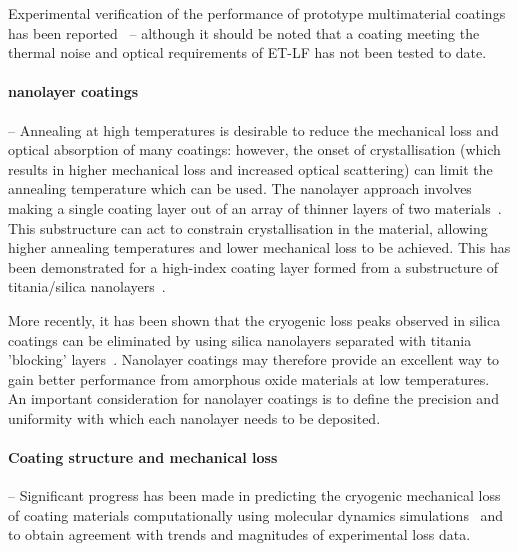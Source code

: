Experimental verification of the performance of prototype multimaterial coatings has been reported~\cite{Gras_GWADW,Kinley_Hanlon_Warsaw} -- although it should be noted that a coating meeting the thermal noise and optical requirements of ET-LF has not been tested to date.

\paragraph{nanolayer coatings} -- Annealing at high temperatures is desirable to reduce the mechanical loss and optical absorption of many coatings: however, the onset of crystallisation (which results in higher mechanical loss and increased optical scattering) can limit the annealing temperature which can be used. The nanolayer approach involves making a single coating layer out of an array of thinner layers of two materials~\cite{Pan2014,Sankur1989}. This substructure can act to constrain crystallisation in the material, allowing higher annealing temperatures and lower mechanical loss to be achieved. This has been demonstrated for a high-index coating layer formed from a substructure of titania/silica nanolayers~\cite{Pan2014}.

More recently, it has been shown that the cryogenic loss peaks observed in silica coatings can be eliminated by using silica nanolayers separated with titania 'blocking' layers~\cite{Kuo2019}. Nanolayer coatings may therefore provide an excellent way to gain better performance from amorphous oxide materials at low temperatures. An important consideration for nanolayer coatings is to define the precision and uniformity with which each nanolayer needs to be deposited.

\paragraph{Coating structure and mechanical loss} -- Significant progress has been made in predicting the cryogenic mechanical loss of coating materials computationally using molecular dynamics simulations~\cite{Hamadan2014,Trinastic2016,Billman2017} and to obtain agreement with trends and magnitudes of experimental loss data.

